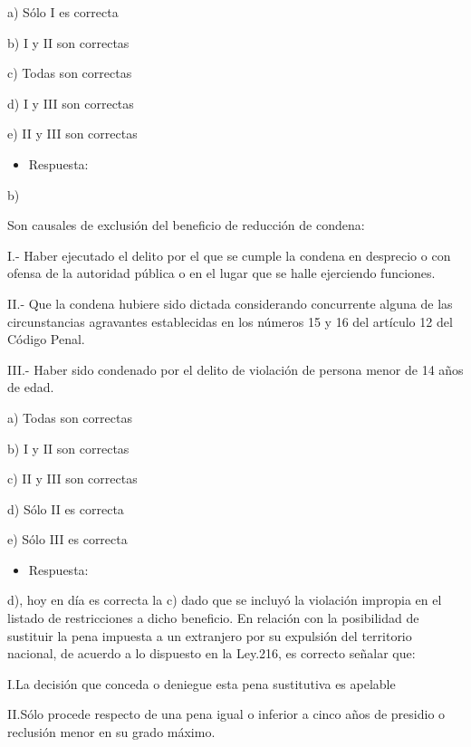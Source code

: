 \documentclass[letterpaper, 11pt]{article}
\begin{document}
a) Sólo I es correcta

b) I y II son correctas

c) Todas son correctas

d) I y III son correctas

e) II y III son correctas


\begin{itemize}
\item Respuesta:
\end{itemize}

b)


Son causales de exclusión del beneficio de reducción de condena:


I.- Haber ejecutado el delito por el que se cumple la condena en
desprecio o con ofensa de la autoridad pública o en el lugar que se
halle ejerciendo funciones.



II.- Que la condena hubiere sido dictada considerando concurrente
alguna de las circunstancias agravantes establecidas en los números 15
y 16 del artículo 12 del Código Penal.



III.- Haber sido condenado por el delito de violación de persona menor
de 14 años de edad.



a) Todas son correctas

b) I y II son correctas

c) II y III son correctas

d) Sólo II es correcta

e) Sólo III es correcta


\begin{itemize}
\item Respuesta:
\end{itemize}

d), hoy en día es correcta la c) dado que se incluyó la violación
impropia en el listado de restricciones a dicho beneficio. En relación
con la posibilidad de sustituir la pena impuesta a un extranjero por
su expulsión del territorio nacional, de acuerdo a lo dispuesto en la
Ley.216, es correcto señalar que:



I.La decisión que conceda o deniegue esta pena sustitutiva es apelable



II.Sólo procede respecto de una pena igual o inferior a cinco años de
presidio o reclusión menor en su grado máximo.
\end{document}
